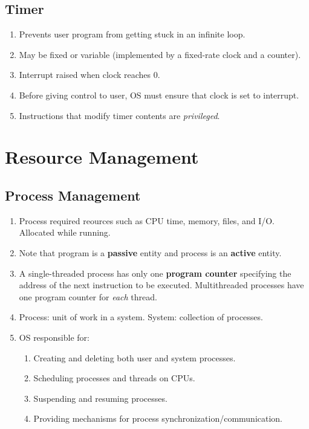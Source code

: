 \documentclass[journal,12pt,twocolumn]{IEEEtran}
\begin{document}
\subsection{Timer}
\begin{enumerate}
    \item Prevents user program from getting stuck in an infinite loop.
    \item May be fixed or variable (implemented by a fixed-rate clock and a 
    counter).
    \item Interrupt raised when clock reaches 0.
    \item Before giving control to user, OS must ensure that clock is set to 
    interrupt.
    \item Instructions that modify timer contents are \textit{privileged}.
\end{enumerate}

\section{Resource Management}

\subsection{Process Management}
\begin{enumerate}
    \item Process required reources such as CPU time, memory, files, and I/O. 
    Allocated while running.
    \item Note that program is a \textbf{passive} entity and process is an 
    \textbf{active} entity.
    \item A single-threaded process has only one \textbf{program counter}
    specifying the address of the next instruction to be executed. Multithreaded 
    processes have one program counter for \textit{each} thread.
    \item Process: unit of work in a system.
    System: collection of processes.
    \item OS responsible for:
    \begin{enumerate}
        \item Creating and deleting both user and system processes.
        \item Scheduling processes and threads on CPUs.
        \item Suspending and resuming processes.
        \item Providing mechanisms for process synchronization/communication.
    \end{enumerate}
\end{enumerate}
\end{document}
